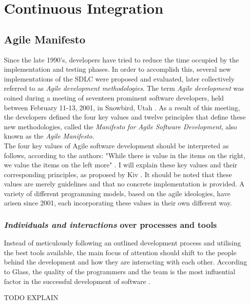 \section{Continuous Integration}
\subsection{Agile Manifesto}
Since the late 1990's, developers have tried to reduce the time occupied by the implementation and testing phases. In order to accomplish this, several new implementations of the SDLC were proposed and evaluated, later collectively referred to as \emph{Agile development methodologies}. The term \emph{Agile development} was coined during a meeting of seventeen prominent software developers, held between February 11-13, 2001, in Snowbird, Utah \cite{jimhighsmith2001}. As a result of this meeting, the developers defined the four key values and twelve principles that define these new methodologies, called the \emph{Manifesto for Agile Software Development}, also known as the \emph{Agile Manifesto}.\\

\noindent The four key values of Agile software development should be interpreted as follows, according to the authors: "While there is value in the items on the right, we value the items on the left more" \cite{beck2001agile}. I will explain these key values and their corresponding principles, as proposed by Kiv \cite[p.~12]{10.1007/978-3-030-03673-7_2}. It should be noted that these values are merely guidelines and that no concrete implementation is provided. A variety of different programming models, based on the agile ideologies, have arisen since 2001, each incorporating these values in their own different way.

\subsubsection{\emph{Individuals and interactions} over processes and tools}
Instead of meticulously following an outlined development process and utilising the best tools available, the main focus of attention should shift to the people behind the development and how they are interacting with each other. According to Glass, the quality of the programmers and the team is the most influential factor in the successful development of software \cite{glass2001agile}. 

TODO EXPLAIN

